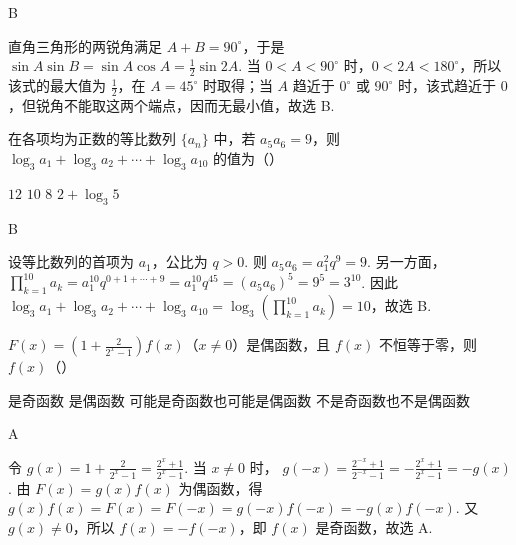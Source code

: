 \documentclass[UTF8,a4paper,oneside,11pt]{ctexbook}
\begin{document}
\begin{answer}
B
\end{answer}

\begin{solution}
直角三角形的两锐角满足 \(A+B=90^\circ\)，于是
\(\sin A\sin B=\sin A\cos A=\frac{1}{2}\sin 2A\). 当 \(0<A<90^\circ\) 时，\(0<2A<180^\circ\)，所以该式的最大值为 \(\frac{1}{2}\)，在 \(A=45^\circ\) 时取得；当 \(A\) 趋近于 \(0^\circ\) 或 \(90^\circ\) 时，该式趋近于 \(0\)，但锐角不能取这两个端点，因而无最小值，故选 B.
\end{solution}

\begin{problem}
在各项均为正数的等比数列 \(\{a_{n}\}\) 中，若 \(a_{5}a_{6} = 9\)，则 \(\log_{3} a_{1} + \log_{3} a_{2} + \cdots + \log_{3} a_{10}\) 的值为（\quad）

\choices
    {\(12\)}
    {\(10\)}
    {\(8\)}
    {\(2 + \log_{3} 5\)}
\end{problem}

\begin{answer}
B
\end{answer}

\begin{solution}
设等比数列的首项为 \(a_1\)，公比为 \(q>0\). 则
\(a_5a_6=a_1^2q^9=9\). 另一方面，
\(\displaystyle \prod_{k=1}^{10}a_k=a_1^{10}q^{0+1+\cdots+9}=a_1^{10}q^{45}=(a_5a_6)^5=9^5=3^{10}\). 因此
\(\displaystyle \log_3a_1+\log_3a_2+\cdots+\log_3a_{10}=\log_3\left(\prod_{k=1}^{10}a_k\right)=10\)，故选 B.
\end{solution}

\begin{problem}
\(F(x) = \left(1 + \frac{2}{2^x - 1}\right)f(x)\)（\(x\neq 0\)）是偶函数，且 \(f(x)\) 不恒等于零，则 \(f(x)\)（\quad）

\choices
    {是奇函数}
    {是偶函数}
    {可能是奇函数也可能是偶函数}
    {不是奇函数也不是偶函数}
\end{problem}

\begin{answer}
A
\end{answer}

\begin{solution}
令 \(\displaystyle g(x)=1+\frac{2}{2^x-1}=\frac{2^x+1}{2^x-1}\). 当 \(x\ne0\) 时，
\(\displaystyle g(-x)=\frac{2^{-x}+1}{2^{-x}-1}=-\frac{2^x+1}{2^x-1}=-g(x)\). 由 \(F(x)=g(x)f(x)\) 为偶函数，得
\(g(x)f(x)=F(x)=F(-x)=g(-x)f(-x)=-g(x)f(-x)\). 又 \(g(x)\ne0\)，所以 \(f(x)=-f(-x)\)，即 \(f(x)\) 是奇函数，故选 A.
\end{solution}
\end{document}
